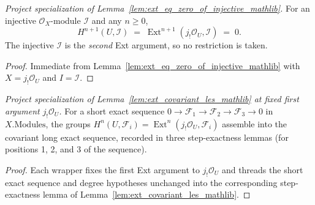 \begin{lemma}\leanok
  \label{lem:absolute_cohomology_injective_vanishing}
  \textit{Project specialization of Lemma~\ref{lem:ext_eq_zero_of_injective_mathlib}.}
  For an injective \(\mathcal{O}_X\)-module \(\mathcal{I}\) and any \(n \geq 0\),
  \[
    H^{n+1}(U, \mathcal{I}) \;=\; \operatorname{Ext}^{n+1}(j_!\mathcal{O}_U, \mathcal{I}) \;=\; 0.
  \]
  The injective \(\mathcal{I}\) is the \emph{second} Ext argument, so no restriction is taken.
\end{lemma}
\begin{proof}
  \leanok
  Immediate from Lemma~\ref{lem:ext_eq_zero_of_injective_mathlib} with \(X = j_!\mathcal{O}_U\) and
  \(I = \mathcal{I}\).
\end{proof}

\begin{lemma}
  \label{lem:absolute_cohomology_covariant_les}
  \textit{Project specialization of Lemma~\ref{lem:ext_covariant_les_mathlib} at fixed first
  argument \(j_!\mathcal{O}_U\).}
  For a short exact sequence \(0 \to \mathcal{F}_1 \to \mathcal{F}_2 \to \mathcal{F}_3 \to 0\) in
  \(X.\mathrm{Modules}\), the groups \(H^n(U, \mathcal{F}_i) = \operatorname{Ext}^n(j_!
  \mathcal{O}_U, \mathcal{F}_i)\) assemble into the covariant long exact sequence, recorded in
  three step-exactness lemmas (for positions 1, 2, and 3 of the sequence).
\end{lemma}
\begin{proof}
  Each wrapper fixes the first Ext argument to \(j_!\mathcal{O}_U\) and threads the short exact
  sequence and degree hypotheses unchanged into the corresponding step-exactness lemma of
  Lemma~\ref{lem:ext_covariant_les_mathlib}.
\end{proof}

